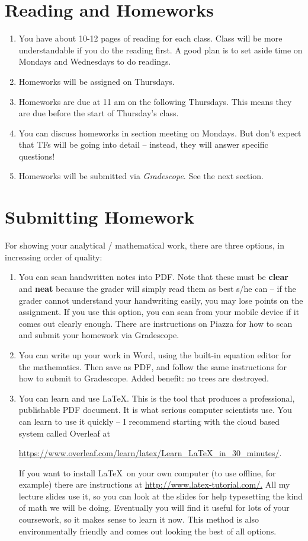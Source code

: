 \documentclass[11pt]{article}
\begin{document}
\newpage
\section*{Reading and Homeworks}

\begin{enumerate}
\item  You have about 10-12 pages of reading for each class.   Class will be
more understandable if you do the reading first.   A good plan is to set aside
time on Mondays and Wednesdays to do readings.
\item  Homeworks will be assigned on Thursdays.
\item Homeworks are due at 11 am on the following Thursdays.  This means
  they are due 
before the start of Thursday's class.
\item You can discuss homeworks in section meeting on Mondays.   But don't
expect that TFs will be going into detail -- instead, they will
answer specific questions!
\item Homeworks will be submitted via \emph{Gradescope}.  See the next section.
\end{enumerate}

\section*{Submitting Homework}
For showing your analytical / mathematical work, there are three
options, in increasing order of quality:
\begin{enumerate}
\item You can scan handwritten notes into PDF.    Note that these must
  be \textbf{clear} and \textbf{neat} because the grader will simply
  read them as best s/he can -- if the grader cannot understand your 
  handwriting easily, you may lose points on the assignment.  If you use this option, you can scan
  from your mobile device if it comes out clearly enough.   There are
  instructions on Piazza for how to scan and submit your homework via Gradescope.
\item You can write up your work in Word, using the built-in equation
  editor for the mathematics.   Then save as PDF, and follow the same
  instructions for how to submit to Gradescope.    Added benefit: no
  trees are destroyed.
\item You can learn and use \LaTeX.   This is the tool that produces a
  professional, publishable PDF document.   It is what serious
  computer scientists use.  You can learn to use it quickly -- I
  recommend starting with the cloud based system called Overleaf at

  \url{https://www.overleaf.com/learn/latex/Learn_LaTeX_in_30_minutes/}.

  If you want to install \LaTeX\ on your own computer
   (to use offline, for example) there are instructions at 
  \url{http://www.latex-tutorial.com/.}   All my lecture
  slides use it, so you can look at the slides for help typesetting the
  kind of math we will be doing.  Eventually you will
  find it useful for lots of your coursework, so it makes sense to learn it
  now.   This method is also environmentally friendly and comes out looking
  the best of all options. 
\end{enumerate}
\end{document}
